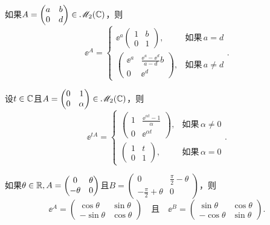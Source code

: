 \begin{corollary}
  \cite[p.176]{9} 如果$A=\begin{pmatrix}
    a & b \\
    0 & d
  \end{pmatrix}\in\mathscr M_2(\mathbb C)$，则
  \[
    \ee^A = \begin{cases}
      \ee^a \begin{pmatrix}
              1 & b \\
              0 & 1
             \end{pmatrix}, & \text{如果}\, a=d \\
      \begin{pmatrix}
        \ee^a & \frac{\ee^a-\ee^d}{a-d}b \\
        0 & \ee^d
      \end{pmatrix}, & \text{如果}\, a\ne d
    \end{cases}.
  \]
\end{corollary}

\begin{corollary}
  \cite[p.717]{9} 设$t\in\mathbb C$且$A=\begin{pmatrix}
    0 & 1 \\
    0 & \alpha
  \end{pmatrix}\in\mathscr M_2(\mathbb C)$，则
  \[
    \ee^{tA} = \begin{cases}
      \begin{pmatrix}
        1 & \frac{\ee^{\alpha t}-1}\alpha \\
        0 & \ee^{\alpha t}
      \end{pmatrix}, & \text{如果}\, \alpha \ne 0\\
      \begin{pmatrix}
        1 & t \\
        0 & 1
      \end{pmatrix}, & \text{如果}\, \alpha = 0
    \end{cases}.
  \]
\end{corollary}

\begin{corollary}
  \cite[p.717]{9} 如果$\theta\in\mathbb R,A=\begin{pmatrix}
    0 & \theta \\
    -\theta & 0
  \end{pmatrix}$且$B=\begin{pmatrix}
    0 & \frac\pi2 - \theta \\
    -\frac\pi2 + \theta & 0
  \end{pmatrix}$，则
  \[
    \ee^A = \begin{pmatrix}
      \cos\theta & \sin \theta \\
      -\sin\theta & \cos\theta
    \end{pmatrix}\quad \text{且}\quad
    \ee^B = \begin{pmatrix}
      \sin\theta & \cos\theta \\
      -\cos\theta & \sin\theta
    \end{pmatrix}.
  \]
\end{corollary}


